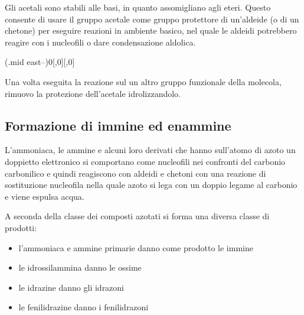 Gli acetali sono stabili alle basi, in quanto assomigliano agli eteri. Questo consente di usare il gruppo acetale come gruppo protettore di un'aldeide (o di un chetone) per eseguire reazioni in ambiente basico, nel quale le aldeidi potrebbero reagire con i nucleofili o dare condensazione aldolica.

\begin{reaction}
	\arrow(.mid east--){0}[,0]\+[,0]
	\arrow{->[\Hpiu{1}]}
\end{reaction}

Una volta eseguita la reazione sul un altro gruppo funzionale della molecola, rimuovo la protezione dell'acetale idrolizzandolo.


\subsection{Formazione di immine ed enammine}
L'ammoniaca, le ammine e alcuni loro derivati che hanno sull'atomo di azoto un doppietto elettronico si comportano come nucleofili nei confronti del carbonio carbonilico e quindi reagiscono con aldeidi e chetoni con una reazione di sostituzione nucleofila nella quale azoto si lega con un doppio legame al carbonio e viene espulsa acqua.

A seconda della classe dei composti azotati si forma una diversa classe di prodotti:
\begin{itemize}
	\item l'ammoniaca e ammine primarie danno come prodotto le immine
	\item le idrossilammina danno le ossime
	\item le idrazine danno gli idrazoni
	\item le fenilidrazine danno i fenilidrazoni
\end{itemize}

